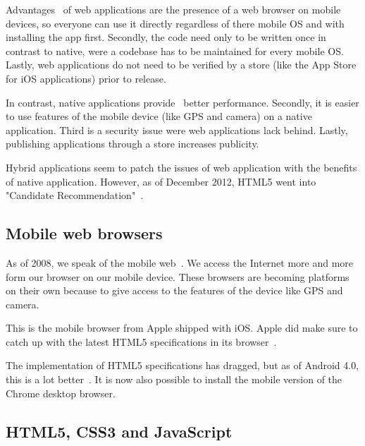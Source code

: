 \documentclass[a4paper]{artikel3}
\renewcommand{\paragraph}[1]{\vspace{2mm} \noindent {\bf #1}  }
\begin{document}
Advantages~\cite{Accenture2012} of web applications are the presence of a web browser on mobile devices, so everyone can use it directly regardless of there mobile OS and with installing the app first.
Secondly, the code need only to be written once in contrast to native, were a codebase has to be maintained for every mobile OS.
Lastly, web applications do not need to be verified by a store (like the App Store for iOS applications) prior to release.

In contrast, native applications provide~\cite{Accenture2012} better performance.
Secondly, it is easier to use features of the mobile device (like GPS and camera) on a native application.
Third is a security issue were web applications lack behind.
Lastly, publishing applications through a store increases publicity.

Hybrid applications seem to patch the issues of web application with the benefits of native application.
However, as of December 2012, HTML5 went into "Candidate Recommendation"~\cite{Jacobs2012}.

\subsection{Mobile web browsers}
As of 2008, we speak of the mobile web~\cite{Hales2012}.
We access the Internet more and more form our browser on our mobile device.
These browsers are becoming platforms on their own because to give access to the features of the device like GPS and camera. 

\paragraph{Mobile Safari}
This is the mobile browser from Apple shipped with iOS.
Apple did make sure to catch up with the latest HTML5 specifications in its browser~\cite{Hales2012}.

\paragraph{Android browser}
The implementation of HTML5 specifications has dragged, but as of Android 4.0, this is a lot better~\cite{Hales2012}.
It is now also possible to install the mobile version of the Chrome desktop browser.

\subsection{HTML5, CSS3 and JavaScript}
\end{document}
